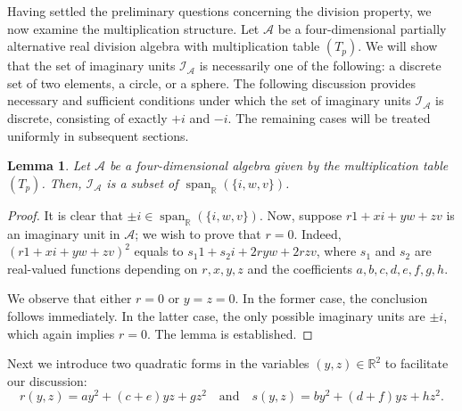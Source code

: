 \documentclass{amsart}
\theoremstyle{definition}
\theoremstyle{plain}
\newtheorem{lemma}{Lemma}
\begin{document}
Having settled the preliminary questions concerning the division property, we now examine the multiplication structure. Let 
$\mathcal A$ be a four-dimensional partially alternative real division algebra with multiplication  table $(T_p)$.
We will show that the set of imaginary units $\mathcal{I_A}$ is necessarily one of the following: a discrete set of two elements, a circle, or a sphere. The following discussion provides necessary and sufficient conditions under which the set of imaginary units $\mathcal{I_A}$ is discrete, consisting of exactly $+i$ and $-i$. The remaining cases will be treated uniformly in subsequent sections.

\begin{lemma}
Let $\mathcal{A}$ be a four-dimensional algebra given by the multiplication table $(T_p)$. Then, $\mathcal{I}_\mathcal{A}$ is a subset of $\operatorname{span}_{\mathbb R}(\{i,w,v\})$.
\end{lemma}
\begin{proof}
It is clear that $\pm i\in \operatorname{span}_{\mathbb R}(\{i,w,v\})$. Now, suppose $r1+xi+yw+zv$ is an imaginary unit in $\mathcal{A}$; we wish to prove that $r=0$. Indeed, $(r1+xi+yw+zv)^2$ equals to $s_1 1+s_2 i+2ryw+2rzv$, where $s_1$ and $s_2$ are real-valued functions depending on $r,x,y,z$ and the coefficients $a,b,c,d,e,f,g,h$.

We observe that either $r=0$ or $y=z=0$. In the former case, the conclusion follows immediately. In the latter case, the only possible imaginary units are $\pm i$, which again implies $r=0$. The lemma is established.
\end{proof}

Next we introduce two quadratic forms in the variables $(y,z)\in\mathbb R^2$ to facilitate our discussion:
$$r(y,z)=ay^2+(c+e)yz+gz^2\quad\text{and}\quad s(y,z)=by^2+(d+f)yz+hz^2.$$
\end{document}
